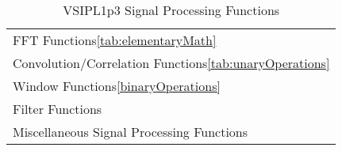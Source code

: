 \begin{table}[H]
\caption{VSIPL1p3 Signal Processing Functions}
\label{tab:signalProcessingFunctions}
\begin{center}
\begin{tabular}{l}
FFT Functions\ref{tab:elementaryMath}\\
Convolution/Correlation Functions\ref{tab:unaryOperations}\\
Window Functions\ref{binaryOperations}\\
Filter Functions\\
Miscellaneous Signal Processing Functions\\
\end{tabular}
\end{center}
\label{default}
\end{table}%